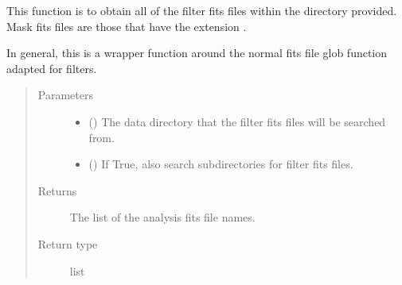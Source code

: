 \documentclass[letterpaper,10pt,english]{sphinxmanual}
\begin{document}
\begin{fulllineitems}
\label{\detokenize{docstrings/ifa_smeargle.analysis.base_functions:ifa_smeargle.analysis.base_functions.get_analysis_fits_filenames}}
This function is to obtain all of the filter fits files
within the directory provided. Mask fits files are those that
have the extension .

In general, this is a wrapper function around the normal
fits file glob function adapted for filters.
\begin{quote}\begin{description}
\item[{Parameters}] \leavevmode\begin{itemize}
\item {} 
 () \textendash{} The data directory that the filter fits files will be
searched from.

\item {} 
 (\sphinxstyleliteralemphasis{\sphinxupquote{ (}}\sphinxstyleliteralemphasis{\sphinxupquote{)}}) \textendash{} If True, also search subdirectories for filter fits files.

\end{itemize}

\item[{Returns}] \leavevmode
{} \textendash{} The list of the analysis fits file names.

\item[{Return type}] \leavevmode
list

\end{description}\end{quote}

\end{fulllineitems}

\end{document}
